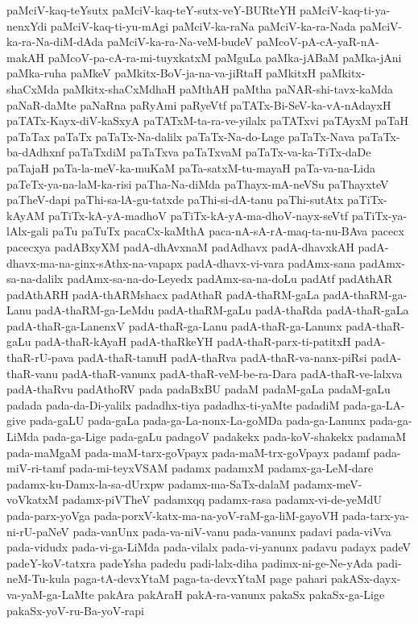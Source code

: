 {paMciV-kaq-teYsutx
paMciV-kaq-teY-sutx-veY-BURteYH
paMciV-kaq-ti-ya-nenxYdi
paMciV-kaq-ti-yu-mAgi
paMciV-ka-raNa
paMciV-ka-ra-Nada
paMciV-ka-ra-Na-diM-dAda
paMciV-ka-ra-Na-veM-budeV
paMcoV-pA-cA-yaR-nA-makAH
paMcoV-pa-cA-ra-mi-tuyxkatxM
paMguLa
paMka-jABaM
paMka-jAni
paMka-ruha
paMkeV
paMkitx-BoV-ja-na-va-jiRtaH
paMkitxH
paMkitx-shaCxMda
paMkitx-shaCxMdhaH
paMthAH
paMtha
paNAR-shi-tavx-kaMda
paNaR-daMte
paNaRna
paRyAmi
paRyeVtf
paTATx-Bi-SeV-ka-vA-nAdayxH
paTATx-Kayx-diV-kaSxyA
paTATxM-ta-ra-ve-yilalx
paTATxvi
paTAyxM
paTaH
paTaTax
paTaTx
paTaTx-Na-dalilx
paTaTx-Na-do-Lage
paTaTx-Nava
paTaTx-ba-dAdhxnf
paTaTxdiM
paTaTxva
paTaTxvaM
paTaTx-va-ka-TiTx-daDe
paTajaH
paTa-la-meV-ka-muKaM
paTa-satxM-tu-mayaH
paTa-va-na-Lida
paTeTx-ya-na-laM-ka-risi
paTha-Na-diMda
paThayx-mA-neVSu
paThayxteV
paTheV-dapi
paThi-sa-lA-gu-tatxde
paThi-si-dA-tanu
paThi-sutAtx
paTiTx-kAyAM
paTiTx-kA-yA-madhoV
paTiTx-kA-yA-ma-dhoV-nayx-seVtf
paTiTx-ya-lAlx-gali
paTu
paTuTx
pacaCx-kaMthA
paca-nA-sA-rA-maq-ta-nu-BAva
pacecx
pacecxya
padABxyXM
padA-dhAvxnaM
padAdhavx
padA-dhavxkAH
padA-dhavx-ma-na-ginx-sAthx-na-vapapx
padA-dhavx-vi-vara
padAmx-sana
padAmx-sa-na-dalilx
padAmx-sa-na-do-Leyedx
padAmx-sa-na-doLu
padAtf
padAthAR
padAthARH
padA-thARMshacx
padAthaR
padA-thaRM-gaLa
padA-thaRM-ga-Lanu
padA-thaRM-ga-LeMdu
padA-thaRM-gaLu
padA-thaRda
padA-thaR-gaLa
padA-thaR-ga-LanenxV
padA-thaR-ga-Lanu
padA-thaR-ga-Lanunx
padA-thaR-gaLu
padA-thaR-kAyaH
padA-thaRkeYH
padA-thaR-parx-ti-patitxH
padA-thaR-rU-pava
padA-thaR-tanuH
padA-thaRva
padA-thaR-va-nanx-piRsi
padA-thaR-vanu
padA-thaR-vanunx
padA-thaR-veM-be-ra-Dara
padA-thaR-ve-lalxva
padA-thaRvu
padAthoRV
pada
padaBxBU
padaM
padaM-gaLa
padaM-gaLu
padada
pada-da-Di-yalilx
padadhx-tiya
padadhx-ti-yaMte
padadiM
pada-ga-LA-give
pada-gaLU
pada-gaLa
pada-ga-La-nonx-La-goMDa
pada-ga-Lanunx
pada-ga-LiMda
pada-ga-Lige
pada-gaLu
padagoV
padakekx
pada-koV-shakekx
padamaM
pada-maMgaM
pada-maM-tarx-goVpayx
pada-maM-trx-goVpayx
padamf
pada-miV-ri-tamf
pada-mi-teyxVSAM
padamx
padamxM
padamx-ga-LeM-dare
padamx-ku-Damx-la-sa-dUrxpw
padamx-ma-SaTx-dalaM
padamx-meV-voVkatxM
padamx-piVTheV
padamxqq
padamx-rasa
padamx-vi-de-yeMdU
pada-parx-yoVga
pada-porxV-katx-ma-na-yoV-raM-ga-liM-gayoVH
pada-tarx-ya-ni-rU-paNeV
pada-vanUnx
pada-va-niV-vanu
pada-vanunx
padavi
pada-viVva
pada-vidudx
pada-vi-ga-LiMda
pada-vilalx
pada-vi-yanunx
padavu
padayx
padeV
padeY-koV-tatxra
padeYsha
padedu
padi-lalx-diha
padimx-ni-ge-Ne-yAda
padi-neM-Tu-kula
paga-tA-devxYtaM
paga-ta-devxYtaM
page
pahari
pakASx-dayx-va-yaM-ga-LaMte
pakAra
pakAraH
pakA-ra-vanunx
pakaSx
pakaSx-ga-Lige
pakaSx-yoV-ru-Ba-yoV-rapi
}
